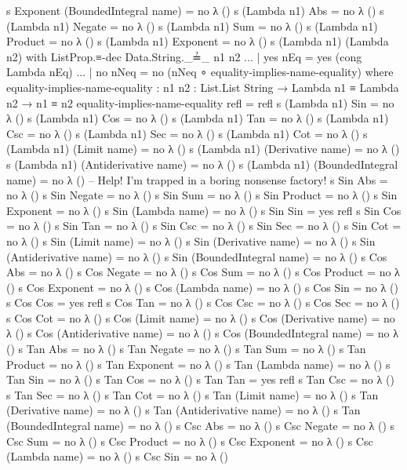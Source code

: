 \documentclass{report}
\begin{document}
\begin{code}
    s Exponent (BoundedIntegral name) = no λ ()
    s (Lambda n1) Abs = no λ ()
    s (Lambda n1) Negate = no λ ()
    s (Lambda n1) Sum = no λ ()
    s (Lambda n1) Product = no λ ()
    s (Lambda n1) Exponent = no λ ()
    s (Lambda n1) (Lambda n2) with ListProp.≡-dec Data.String._≟_ n1 n2
    ... | yes nEq = yes (cong Lambda nEq)
    ... | no nNeq = no (nNeq ∘ equality-implies-name-equality)
      where
      equality-implies-name-equality :
        {n1 n2 : List.List String} →
        Lambda n1 ≡ Lambda n2 →
        n1 ≡ n2
      equality-implies-name-equality refl = refl
    s (Lambda n1) Sin = no λ ()
    s (Lambda n1) Cos = no λ ()
    s (Lambda n1) Tan = no λ ()
    s (Lambda n1) Csc = no λ ()
    s (Lambda n1) Sec = no λ ()
    s (Lambda n1) Cot = no λ ()
    s (Lambda n1) (Limit name) = no λ ()
    s (Lambda n1) (Derivative name) = no λ ()
    s (Lambda n1) (Antiderivative name) = no λ ()
    s (Lambda n1) (BoundedIntegral name) = no λ ()
    -- Help!  I'm trapped in a boring nonsense factory!
    s Sin Abs = no λ ()
    s Sin Negate = no λ ()
    s Sin Sum = no λ ()
    s Sin Product = no λ ()
    s Sin Exponent = no λ ()
    s Sin (Lambda name) = no λ ()
    s Sin Sin = yes refl
    s Sin Cos = no λ ()
    s Sin Tan = no λ ()
    s Sin Csc = no λ ()
    s Sin Sec = no λ ()
    s Sin Cot = no λ ()
    s Sin (Limit name) = no λ ()
    s Sin (Derivative name) = no λ ()
    s Sin (Antiderivative name) = no λ ()
    s Sin (BoundedIntegral name) = no λ ()
    s Cos Abs = no λ ()
    s Cos Negate = no λ ()
    s Cos Sum = no λ ()
    s Cos Product = no λ ()
    s Cos Exponent = no λ ()
    s Cos (Lambda name) = no λ ()
    s Cos Sin = no λ ()
    s Cos Cos = yes refl
    s Cos Tan = no λ ()
    s Cos Csc = no λ ()
    s Cos Sec = no λ ()
    s Cos Cot = no λ ()
    s Cos (Limit name) = no λ ()
    s Cos (Derivative name) = no λ ()
    s Cos (Antiderivative name) = no λ ()
    s Cos (BoundedIntegral name) = no λ ()
    s Tan Abs = no λ ()
    s Tan Negate = no λ ()
    s Tan Sum = no λ ()
    s Tan Product = no λ ()
    s Tan Exponent = no λ ()
    s Tan (Lambda name) = no λ ()
    s Tan Sin = no λ ()
    s Tan Cos = no λ ()
    s Tan Tan = yes refl
    s Tan Csc = no λ ()
    s Tan Sec = no λ ()
    s Tan Cot = no λ ()
    s Tan (Limit name) = no λ ()
    s Tan (Derivative name) = no λ ()
    s Tan (Antiderivative name) = no λ ()
    s Tan (BoundedIntegral name) = no λ ()
    s Csc Abs = no λ ()
    s Csc Negate = no λ ()
    s Csc Sum = no λ ()
    s Csc Product = no λ ()
    s Csc Exponent = no λ ()
    s Csc (Lambda name) = no λ ()
    s Csc Sin = no λ ()

\end{code}
\end{document}
